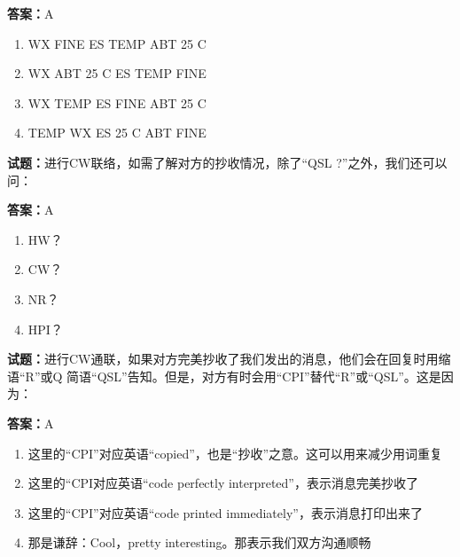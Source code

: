 \documentclass{ctexbook}
\begin{document}
\textbf{答案：}A 

\begin{enumerate}[leftmargin=3em]
  \item WX FINE ES TEMP ABT 25 C 

  \item WX ABT 25 C ES TEMP FINE 

  \item WX TEMP ES FINE ABT 25 C 

  \item TEMP WX ES 25 C ABT FINE 

\end{enumerate}





\vspace{1em}

\textbf{试题：}进行CW联络，如需了解对方的抄收情况，除了“QSL ?”之外，我们还可以问： 

\textbf{答案：}A 

\begin{enumerate}[leftmargin=3em]
  \item HW？ 

  \item CW？ 

  \item NR？ 

  \item HPI？ 

\end{enumerate}





\vspace{1em}

\textbf{试题：}进行CW通联，如果对方完美抄收了我们发出的消息，他们会在回复时用缩语“R”或Q
简语“QSL”告知。但是，对方有时会用“CPI”替代“R”或“QSL”。这是因为： 

\textbf{答案：}A 

\begin{enumerate}[leftmargin=3em]
  \item 这里的“CPI”对应英语“copied”，也是“抄收”之意。这可以用来减少用词重复 

  \item 这里的“CPI对应英语“code perfectly interpreted”，表示消息完美抄收了 

  \item 这里的“CPI”对应英语“code printed immediately”，表示消息打印出来了 

  \item 那是谦辞：Cool，pretty interesting。那表示我们双方沟通顺畅 

\end{enumerate}
\end{document}

